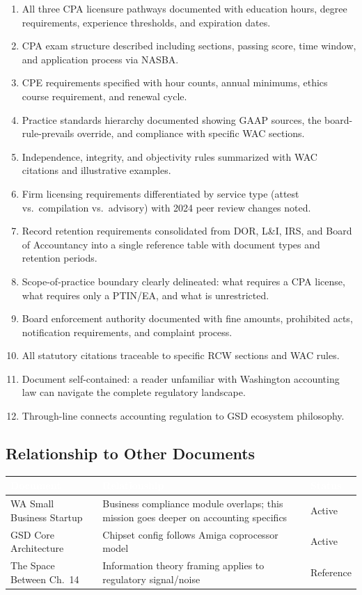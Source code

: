 \documentclass[11pt,letterpaper]{article}
\newcommand{\tableheader}[1]{\textbf{\sffamily\textcolor{white}{#1}}}
\begin{document}
\begin{enumerate}[leftmargin=2.5em]
  \item All three CPA licensure pathways documented with education hours, degree requirements, experience thresholds, and expiration dates.
  \item CPA exam structure described including sections, passing score, time window, and application process via NASBA.
  \item CPE requirements specified with hour counts, annual minimums, ethics course requirement, and renewal cycle.
  \item Practice standards hierarchy documented showing GAAP sources, the board-rule-prevails override, and compliance with specific WAC sections.
  \item Independence, integrity, and objectivity rules summarized with WAC citations and illustrative examples.
  \item Firm licensing requirements differentiated by service type (attest vs.\ compilation vs.\ advisory) with 2024 peer review changes noted.
  \item Record retention requirements consolidated from DOR, L\&I, IRS, and Board of Accountancy into a single reference table with document types and retention periods.
  \item Scope-of-practice boundary clearly delineated: what requires a CPA license, what requires only a PTIN/EA, and what is unrestricted.
  \item Board enforcement authority documented with fine amounts, prohibited acts, notification requirements, and complaint process.
  \item All statutory citations traceable to specific RCW sections and WAC rules.
  \item Document self-contained: a reader unfamiliar with Washington accounting law can navigate the complete regulatory landscape.
  \item Through-line connects accounting regulation to GSD ecosystem philosophy.
\end{enumerate}

\subsection{Relationship to Other Documents}

\begin{center}
\begin{tabularx}{\textwidth}{L{4cm}XC{2.5cm}}
\toprule
{}
\tableheader{Document} & \tableheader{Relationship} & \tableheader{Status} \\
\midrule
WA Small Business Startup & Business compliance module overlaps; this mission goes deeper on accounting specifics & Active \\
GSD Core Architecture & Chipset config follows Amiga coprocessor model & Active \\
The Space Between Ch.\ 14 & Information theory framing applies to regulatory signal/noise & Reference \\
\bottomrule
\end{tabularx}
\end{center}
\end{document}
